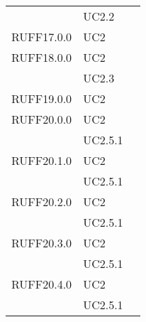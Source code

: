 \begin{center}
\begin{longtable}{lp{}l}
 & UC2.2 \\
RUFF17.0.0 & UC2 \\
RUFF18.0.0 & UC2 \\
 & UC2.3 \\
RUFF19.0.0 & UC2 \\
RUFF20.0.0 & UC2 \\
 & UC2.5.1 \\
RUFF20.1.0 & UC2 \\
 & UC2.5.1 \\
RUFF20.2.0 & UC2 \\
 & UC2.5.1 \\
RUFF20.3.0 & UC2 \\
 & UC2.5.1 \\
RUFF20.4.0 & UC2 \\
 & UC2.5.1 \\
\bottomrule
\end{longtable}
\end{center}
